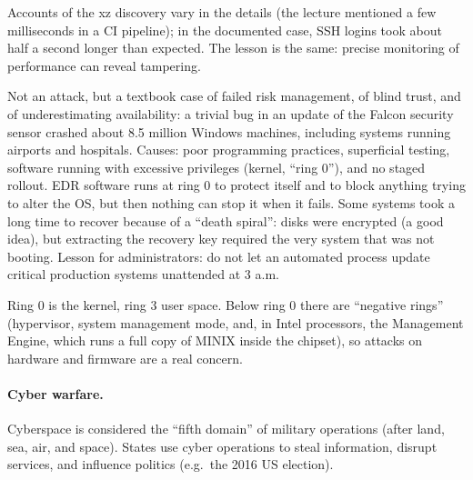 \begin{remark}
Accounts of the xz discovery vary in the details (the lecture mentioned a few milliseconds in a CI pipeline); in the documented case, SSH logins took about half a second longer than expected. The lesson is the same: precise monitoring of performance can reveal tampering.
\end{remark}

\begin{remark}
Not an attack, but a textbook case of failed risk management, of blind trust, and of underestimating availability: a trivial bug in an update of the Falcon security sensor crashed about 8.5 million Windows machines, including systems running airports and hospitals. Causes: poor programming practices, superficial testing, software running with excessive privileges (kernel, \enquote{ring 0}), and no staged rollout. EDR software runs at ring 0 to protect itself and to block anything trying to alter the OS, but then nothing can stop it when it fails. Some systems took a long time to recover because of a \enquote{death spiral}: disks were encrypted (a good idea), but extracting the recovery key required the very system that was not booting. Lesson for administrators: do not let an automated process update critical production systems unattended at 3 a.m.
\end{remark}

\begin{remark}
Ring 0 is the kernel, ring 3 user space. Below ring 0 there are \enquote{negative rings} (hypervisor, system management mode, and, in Intel processors, the Management Engine, which runs a full copy of MINIX inside the chipset), so attacks on hardware and firmware are a real concern.
\end{remark}

\paragraph{Cyber warfare.} Cyberspace is considered the \enquote{fifth domain} of military operations (after land, sea, air, and space). States use cyber operations to steal information, disrupt services, and influence politics (e.g.\ the 2016 US election).

